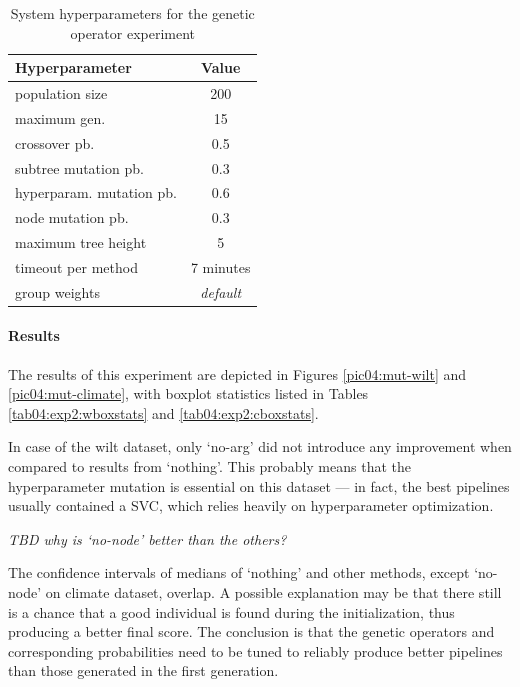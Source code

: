 \begin{table}[ht]
\centering
\caption{System hyperparameters for the genetic operator experiment}\label{tab04:exp2:setting}
\begin{tabular}{l c}
\toprule
\textbf{\upshape Hyperparameter} & \textbf{Value} \\
\midrule
population size & 200 \\
maximum gen. & 15 \\
crossover pb. & 0.5 \\
subtree mutation pb. & 0.3 \\
hyperparam. mutation pb. & 0.6 \\
node mutation pb. & 0.3 \\
maximum tree height & 5 \\
timeout per method  & 7 minutes \\
group weights & \textit{default} \\
\bottomrule

\end{tabular}

\end{table}

\paragraph{Results}
The results of this experiment are depicted in Figures \ref{pic04:mut-wilt} and
\ref{pic04:mut-climate}, with boxplot statistics listed in Tables
\ref{tab04:exp2:wboxstats} and \ref{tab04:exp2:cboxstats}.

In case of the wilt dataset, only `no-arg' did not introduce any improvement
when compared to results from `nothing'. This probably means that the
hyperparameter mutation is essential on this dataset --- in fact, the best
pipelines usually contained a SVC, which relies heavily on hyperparameter
optimization. \citep{Feurer:2015:ERA:2969442.2969547}

\textit{TBD why is `no-node' better than the others?}

The confidence intervals of medians of `nothing' and other methods, except
`no-node' on climate dataset, overlap. A possible explanation may be that
there still is a chance that a good individual is found during the
initialization, thus producing a better final score. The conclusion is that the
genetic operators and corresponding probabilities need to be tuned to reliably
produce better pipelines than those generated in the first generation.

